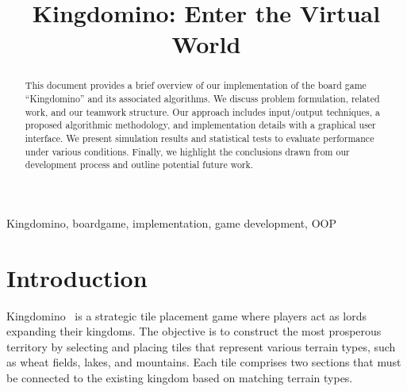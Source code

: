 \documentclass[conference]{IEEEtran}
\begin{document}
\title{Kingdomino: Enter the Virtual World}

\author{
    \and
}

\maketitle

\begin{abstract}
    This document provides a brief overview of our implementation of the board game
    ``Kingdomino'' and its associated algorithms. We discuss problem formulation,
    related work, and our teamwork structure. Our approach includes input/output
    techniques, a proposed algorithmic methodology, and implementation details with
    a graphical user interface. We present simulation results and statistical tests
    to evaluate performance under various conditions. Finally, we highlight the
    conclusions drawn from our development process and outline potential future
    work.
\end{abstract}

\begin{IEEEkeywords}
    Kingdomino, boardgame, implementation, game development, OOP
\end{IEEEkeywords}

\section{Introduction}

Kingdomino~\cite{wiki:kingdomino} is a strategic tile placement game where
players act as lords expanding their kingdoms. The objective is to construct
the most prosperous territory by selecting and placing tiles that represent
various terrain types, such as wheat fields, lakes, and mountains. Each tile
comprises two sections that must be connected to the existing kingdom based on
matching terrain types.
\end{document}
